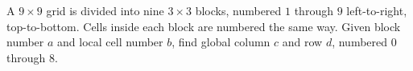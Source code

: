 A $9\times9$ grid is divided into nine $3\times3$ blocks, numbered $1$ through $9$ left-to-right, top-to-bottom. Cells inside each block are numbered the same way. Given block number $a$ and local cell number $b$, find global column $c$ and row $d$, numbered $0$ through $8$.

